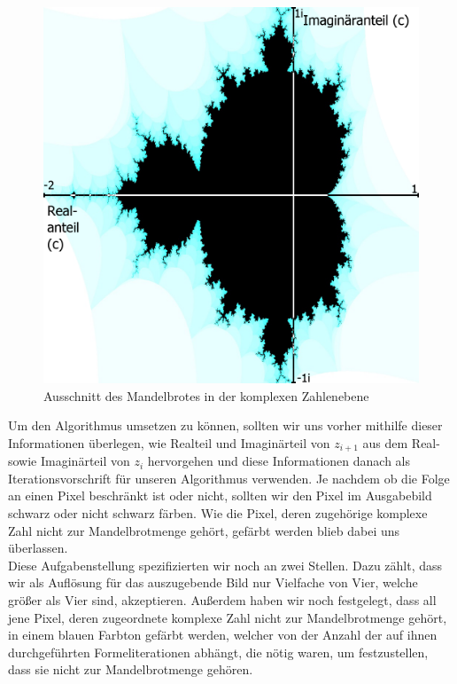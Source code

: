 \documentclass[11pt]{scrartcl}
\begin{document}
\begin{figure}[!ht]
\centering
\includegraphics[scale=0.2]{pictures/MandelbrotMitAchsen.png}
\caption{Ausschnitt des Mandelbrotes in der komplexen Zahlenebene}
\label{fig:Mandelbrot}
\end{figure}

Um den Algorithmus umsetzen zu können, sollten wir uns vorher mithilfe dieser Informationen überlegen, wie Realteil und Imaginärteil von $z_{i+1}$ aus dem Real- sowie Imaginärteil von $z_i$ hervorgehen und diese Informationen danach als Iterationsvorschrift für unseren Algorithmus verwenden.
Je nachdem ob die Folge an einen Pixel beschränkt ist oder nicht, sollten wir den Pixel im Ausgabebild schwarz oder nicht schwarz färben.
Wie die Pixel, deren zugehörige komplexe Zahl nicht zur Mandelbrotmenge gehört, gefärbt werden blieb dabei uns überlassen. \\
Diese Aufgabenstellung spezifizierten wir noch an zwei Stellen.
Dazu zählt, dass wir als Auflösung für das auszugebende Bild nur Vielfache von Vier, welche größer als Vier sind, akzeptieren.
Außerdem haben wir noch festgelegt, dass all jene Pixel, deren zugeordnete komplexe Zahl nicht zur Mandelbrotmenge gehört, in einem blauen Farbton gefärbt werden, welcher von der Anzahl der auf ihnen durchgeführten Formeliterationen abhängt, die nötig waren, um festzustellen, dass sie nicht zur Mandelbrotmenge gehören.
\end{document}
